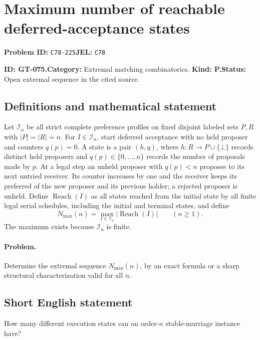 \documentclass[11pt,a4paper]{article}
\begin{document}
\section*{Maximum number of reachable deferred-acceptance states}
\textbf{Problem ID:} \texttt{C78-225}\quad \textbf{JEL:} \texttt{C78}\par
\label{problem:OP-0205}
\label{game:GT-075}
{\sffamily\small\color{muted}
\noindent\textbf{ID: GT-075.}\quad\textbf{Category:} Extremal matching combinatorics.
\quad\textbf{Kind: P.}\quad\textbf{Status:} Open extremal sequence in the cited source.
\par}
\subsection*{Definitions and mathematical statement}
Let \(\mathcal I_n\) be all strict complete preference profiles on fixed
disjoint labeled sets \(P,R\) with \(|P|=|R|=n\).
For \(I\in\mathcal I_n\), start deferred acceptance with no held proposer
and counters \(q(p)=0\). A state is a pair \((h,q)\), where
\(h:R\to P\cup\{\bot\}\) records distinct held proposers and
\(q(p)\in\{0,\ldots,n\}\) records the number of proposals made by \(p\).
At a legal step an unheld proposer with \(q(p)<n\) proposes to its
next untried receiver. Its counter increases by one and the receiver
keeps its preferred of the new proposer and its previous holder;
a rejected proposer is unheld.
Define \(\operatorname{Reach}(I)\) as all states reached from the
initial state by all finite legal serial schedules, including the
initial and terminal states, and define
\[
 N_{\max}(n)=
       \max_{I\in\mathcal I_n}|\operatorname{Reach}(I)|\qquad(n\geq 1).
\]
The maximum exists because \(\mathcal I_n\) is finite.

\paragraph{Problem.}
Determine the extremal sequence \(N_{\max}(n)\), by an exact formula
or a sharp structural characterization valid for all \(n\).

\subsection*{Short English statement}
How many different execution states can an order-\(n\) stable-marriage
instance have?
\end{document}
